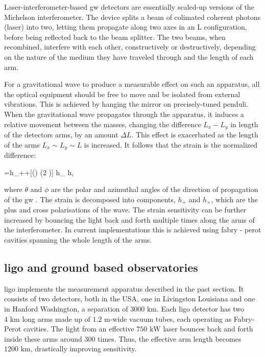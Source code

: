 \documentclass[
  11pt,
  a4paper,
  DIV=11,
  numbers=noendperiod,
  twoside]{scrreprt}
\let\[\relax \let\]\relax %
\DeclareRobustCommand{\[}{\begin{equation}}
\DeclareRobustCommand{\]}{\end{equation}}
\begin{document}
Laser-interferometer-based \gls{gw} detectors are essentially scaled-up
versions of the Michelson interferometer. The device splits a beam of
colimated coherent photons (laser) into two, letting them propagate
along two axes in an L configuration, before being reflected back to the
beam splitter. The two beams, when recombined, interfere with each
other, constructively or destructively, depending on the nature of the
medium they have traveled through and the length of each arm.

For a gravitational wave to produce a measurable effect on such an
apparatus, all the optical equipment should be free to move and be
isolated from external vibrations. This is achieved by hanging the
mirror on precisely-tuned penduli. When the gravitational wave
propagates through the apparatus, it induces a relative movement between
the masses, changing the difference \(L_x-L_y\) in length of the
detectors arms, by an amount \(\Delta L\). This effect is exacerbated as
the length of the arms \(L_x \sim L_y \sim L\) is increased. It follows
that the strain is the normalized difference:

\[
= h_{+}+[\cos (\theta) \sin (2 \phi)] h_{\times} \equiv h,
\]

where \(\theta\) and \(\phi\) are the polar and azimuthal angles of the
direction of propagation of the \gls{gw} . The strain is decomposed into
components, \(h_{+}\) and \(h_{\times}\), which are the plus and cross
polarisations of the wave. The strain sensitivity can be further
increased by bouncing the light back and forth multiple times along the
arms of the interferometer. In current implementations this is achieved
using fabry - perot cavities spanning the whole length of the arms.

\hypertarget{sec-ligo}{%
\subsection{\texorpdfstring{\gls{ligo} and ground based
observatories}{ and ground based observatories}}\label{sec-ligo}}

\gls{ligo} implements the measurement apparatus described in the past
section. It consists of two detectors, both in the USA, one in
Livingston Louisiana and one in Hanford Washington, a separation of
\(3000 \text{ km}\). Each \gls{ligo} detector has two \(4\text{ km}\)
long arms made up of \(1.2\text{ m}\)-wide vacuum tubes, each operating
as Fabry-Perot cavities. The light from an effective \(750\text{ kW}\)
laser bounces back and forth inside these arms around 300 times. Thus,
the effective arm length becomes \(1200\text{ km}\), drastically
improving sensitivity.
\end{document}
